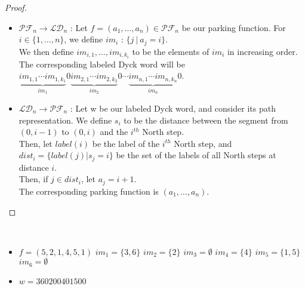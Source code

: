 \begin{proof}
    ~\
    \begin{itemize}
        \item $\mathcal{PF}_n \to \mathcal{LD}_n$ :
        Let $f = (a_1, \ldots, a_n) \in \mathcal{PF}_n$
        be our parking function. For $i \in \{1, \ldots,
        n\}$, we define $im_i$ : $\{j\ |\ a_j = i\}$. \\
        We then define $im_{i,1}, \ldots, im_{i,k_i}$ to be
        the elements of $im_i$ in increasing order.\\
        The corresponding labeled Dyck word will be \\
        $\underbrace{im_{1,1} \cdots im_{1,k_1}}_{im_1}0
         \underbrace{im_{2,1} \cdots im_{2,k_2}}_{im_2}0
         \cdots
         \underbrace{im_{n,1} \cdots im_{n,k_n}}_{im_n}0$.

        \item $\mathcal{LD}_n \to \mathcal{PF}_n$ :
        Let w be our labeled Dyck word, and consider its
        path representation. We define $s_i$ to be the
        distance between the segment from $(0, i-1)$ to
        $(0,i)$ and the $i^{th}$ North step.\\
        Then, let $label(i)$ be the label of the $i^{th}$
        North step, and $dist_i = \{label(j) | s_j = i\}$
        be the set of the labels of all North steps at
        distance $i$.\\
        Then, if $j \in dist_i$, let $a_j = i + 1$.\\
        The corresponding parking function is
        $(a_1, \ldots, a_n)$.
    \end{itemize}
\end{proof}

\begin{example}[$n = 6, \mathcal{PF}_n \to \mathcal{LD}_n$]
    ~\
    \begin{itemize}
        \item $f = (5, 2, 1, 4, 5, 1)$
            \subitem $im_1 = \{3, 6\}$
            \hspace{16mm} $im_2 = \{2\}$
            \hspace{24mm} $im_3 = \emptyset$
            \subitem $im_4 = \{4\}$
            \hspace{2cm} $im_5 = \{1, 5\}$
            \hspace{2cm} $im_6 = \emptyset$
        \item $w = 360200401500$
    \end{itemize}
    
\end{example}

